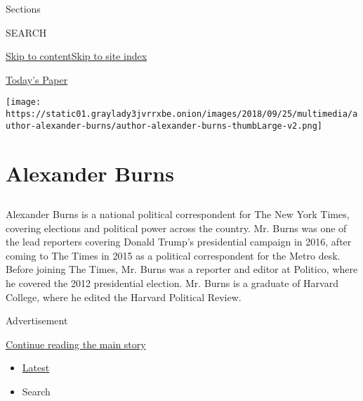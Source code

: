 Sections

SEARCH

\protect\hyperlink{site-content}{Skip to
content}\protect\hyperlink{site-index}{Skip to site index}

\href{https://myaccount.nytimes3xbfgragh.onion/auth/login?response_type=cookie\&client_id=vi}{}

\href{https://www.nytimes3xbfgragh.onion/section/todayspaper}{Today's
Paper}

\texttt{[image: https://static01.graylady3jvrrxbe.onion/images/2018/09/25/multimedia/author-alexander-burns/author-alexander-burns-thumbLarge-v2.png]}

\hypertarget{alexander-burns}{%
\section{Alexander Burns}\label{alexander-burns}}

\subsection{}

Alexander Burns is a national political correspondent for The New York
Times, covering elections and political power across the country. Mr.
Burns was one of the lead reporters covering Donald Trump's presidential
campaign in 2016, after coming to The Times in 2015 as a political
correspondent for the Metro desk. Before joining The Times, Mr. Burns
was a reporter and editor at Politico, where he covered the 2012
presidential election. Mr. Burns is a graduate of Harvard College, where
he edited the Harvard Political Review.

Advertisement

\protect\hyperlink{after-mid1}{Continue reading the main story}

\begin{itemize}
\tightlist
\item
  \protect\hyperlink{stream-panel}{Latest}
\item
  Search
\end{itemize}

